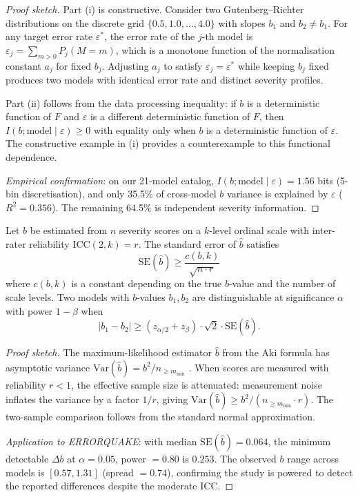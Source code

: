 \begin{proof}[Proof sketch]
Part (i) is constructive. Consider two Gutenberg--Richter distributions
on the discrete grid $\{0.5, 1.0, \ldots, 4.0\}$ with slopes $b_1$ and
$b_2 \neq b_1$. For any target error rate $\varepsilon^*$, the error rate
of the $j$-th model is $\varepsilon_j = \sum_{m > 0} P_j(M = m)$, which
is a monotone function of the normalisation constant $a_j$ for fixed $b_j$.
Adjusting $a_j$ to satisfy $\varepsilon_j = \varepsilon^*$ while keeping
$b_j$ fixed produces two models with identical error rate and distinct
severity profiles.

Part (ii) follows from the data processing inequality: if $b$ is a
deterministic function of $F$ and $\varepsilon$ is a different deterministic
function of $F$, then $I(b; \text{model} \mid \varepsilon) \geq 0$ with
equality only when $b$ is a deterministic function of $\varepsilon$. The
constructive example in (i) provides a counterexample to this functional
dependence.

\emph{Empirical confirmation}: on our 21-model catalog, $I(b; \text{model}
\mid \varepsilon) = 1.56$ bits (5-bin discretisation), and only 35.5\%
of cross-model $b$ variance is explained by $\varepsilon$ ($R^2 = 0.356$).
The remaining 64.5\% is independent severity information.
\end{proof}

\begin{proposition}
\label{prop:resolution}
Let $b$ be estimated from $n$ severity scores on a $k$-level ordinal
scale with inter-rater reliability $\text{ICC}(2,k) = r$. The standard
error of $\hat{b}$ satisfies
\begin{equation}
\text{SE}(\hat{b}) \geq \frac{c(b, k)}{\sqrt{n \cdot r}}
\label{eq:resolution}
\end{equation}
where $c(b, k)$ is a constant depending on the true $b$-value and the
number of scale levels. Two models with $b$-values $b_1, b_2$ are
distinguishable at significance $\alpha$ with power $1 - \beta$ when
\begin{equation}
|b_1 - b_2| \geq (z_{\alpha/2} + z_\beta) \cdot \sqrt{2} \cdot \text{SE}(\hat{b}).
\label{eq:min_delta}
\end{equation}
\end{proposition}

\begin{proof}[Proof sketch]
The maximum-likelihood estimator $\hat{b}$ from the Aki formula has
asymptotic variance $\text{Var}(\hat{b}) = b^2 / n_{\geq m_{\min}}$
\citep{aki1965}. When scores are measured with reliability $r < 1$,
the effective sample size is attenuated: measurement noise inflates
the variance by a factor $1/r$, giving
$\text{Var}(\hat{b}) \geq b^2 / (n_{\geq m_{\min}} \cdot r)$.
The two-sample comparison follows from the standard normal approximation.

\emph{Application to ERRORQUAKE}: with median $\text{SE}(\hat{b}) = 0.064$,
the minimum detectable $\Delta b$ at $\alpha = 0.05$, power $= 0.80$ is
$0.253$. The observed $b$ range across models is $[0.57, 1.31]$
(spread $= 0.74$), confirming the study is powered to detect the reported
differences despite the moderate ICC.
\end{proof}

